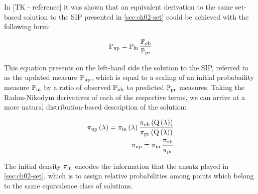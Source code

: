 In [TK - reference] it was shown that an equivalent derivation to the same set-based solution to the SIP presented in \ref{sec:ch02-set} could be achieved with the following form:

\begin{equation}
\dciP
\end{equation}


This equation presents on the left-hand side the solution to the SIP, referred to as the updated measure $\updatedP$, which is equal to a scaling of an initial probabaility measure $\initialP$ by a ratio of observed $\observedP$ to predicted $\predictedP$ measures.
Taking the Radon-Nikodym derivatives of each of the respective terms, we can arrive at a more natural distribution-based description of the solution:

\begin{equation}
\begin{split}
\dci\\
\dciD
\end{split}
\end{equation}

The initial density $\initial$ encodes the information that the ansatz played in \ref{sec:ch02-set}, which is to assign relative probabilities among points which belong to the same equivalence class of solutions.
